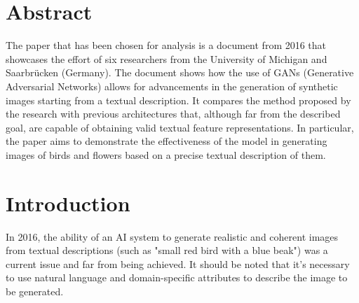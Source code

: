 \section*{Abstract}

The paper that has been chosen for analysis is a document from 2016 
that showcases the effort of six researchers from the University of 
Michigan and Saarbrücken (Germany). 
The document shows how the use of GANs (Generative Adversarial Networks) 
allows for advancements in the generation of synthetic images starting 
from a textual description. 
It compares the method proposed by the research with previous architectures
that, although far from the described goal, are capable of obtaining 
valid textual feature representations. 
In particular, the paper aims to demonstrate the effectiveness of 
the model in generating images of birds and flowers based on a precise 
textual description of them.

\section*{Introduction}

In 2016, the ability of an AI system to generate realistic and 
coherent images from textual descriptions 
(such as "small red bird with a blue beak") was a current issue and 
far from being achieved.
It should be noted that it's necessary to use natural language 
and domain-specific attributes to describe the image to be generated.


